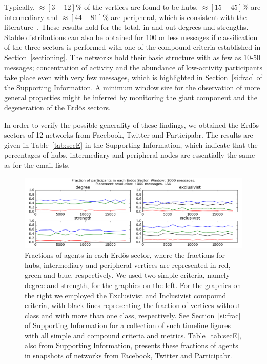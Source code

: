 \documentclass[%
	aip,
	jmp,%
	amsmath,amssymb,
	reprint,%
]{revtex4-1}
\begin{document}
Typically, $\approx [3-12]\%$ of the vertices are found to be hubs, $\approx [15-45]\%$ are intermediary and $\approx [44-81]\%$ are peripheral, which is consistent with the literature~\cite{secFree}.
These results hold for the total, in and out degrees and strengths.
Stable distributions can also be obtained for 100 or less messages if classification of the three sectors is performed with one of the compound criteria established in Section~\ref{sectioning}. 
The networks hold their basic structure with as few as 10-50 messages; concentration of activity and the abundance of low-activity participants take place even with very few messages, which is highlighted in Section~\ref{si:frac} of the Supporting Information.
A minimum window size for the observation of more general properties might be inferred by monitoring the giant component and the degeneration of the Erd\"os sectors.

In order to verify the possible generality of these findings, we obtained the Erd\"os sectors of 12 networks from Facebook, Twitter and Participabr. The results are given in Table~\ref{tab:secE} in the Supporting Information, which indicate that the percentages of hubs, intermediary and peripheral nodes are essentially the same as for the email lists.

\begin{figure} 
	\centering
	\includegraphics[width=\textwidth]{figs/InText-WLAU-S1000}
	\caption{Fractions of agents in each Erd\"os sector, where the fractions for hubs, intermediary and peripheral vertices are represented in red, green and blue, respectively. We used two simple criteria, namely degree and strength, for the graphics on the left. For the graphics on the right we employed the Exclusivist and Inclusivist compound criteria, with black lines representing the fraction of vertices without class and with more than one class, respectively. See Section~\ref{si:frac} of Supporting Information for a collection of such timeline figures with all simple and compound criteria and metrics. Table~\ref{tab:secE}, also from Supporting Information, presents these fractions of agents in snapshots of networks from Facebook, Twitter and Participabr.}
	\label{fig:sectIL}
\end{figure}
\end{document}
